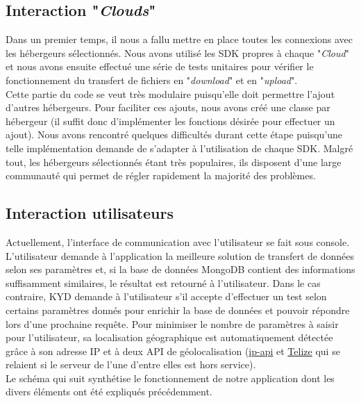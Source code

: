 \documentclass[10pt]{article}
\begin{document}
\subsection{Interaction "\textit{Clouds}"}

Dans un premier temps, il nous a fallu mettre en place toutes les connexions
avec les hébergeurs sélectionnés. Nous avons utilisé les SDK propres à chaque
"\textit{Cloud}" et nous avons ensuite effectué une série de tests unitaires
pour vérifier le fonctionnement du transfert de fichiers en "\textit{download}"
et en "\textit{upload}".\\

Cette partie du code se veut très modulaire puisqu'elle doit permettre l'ajout
d'autres hébergeurs. Pour faciliter ces ajouts, nous avons créé une classe par
hébergeur (il suffit donc d'implémenter les fonctions désirée pour effectuer un
ajout). Nous avons rencontré quelques difficultés durant cette étape puisqu'une
telle implémentation demande de s'adapter à l'utilisation de chaque SDK. Malgré
tout, les hébergeurs sélectionnés étant très populaires, ils disposent d'une
large communauté qui permet de régler rapidement la majorité des problèmes.

\subsection{Interaction utilisateurs}

Actuellement, l'interface de communication avec l'utilisateur se fait sous
console. L'utilisateur demande à l'application la meilleure solution de
transfert de données selon ses paramètres et, si la base de données MongoDB
contient des informations suffisamment similaires, le résultat est retourné à
l'utilisateur. Dans le cas contraire, KYD demande à l'utilisateur s'il accepte
d'effectuer un test selon certains paramètres donnés pour enrichir la base de
données et pouvoir répondre lors d'une prochaine requête. Pour minimiser le
nombre de paramètres à saisir pour l'utilisateur, sa localisation géographique
est automatiquement détectée grâce à son adresse IP et à deux API de
géolocalisation (\href{http://ip-api.com/docs/api:json}{ip-api} et
\href{http://www.telize.com/}{Telize} qui se relaient si le serveur de l'une
d'entre elles est hors service).\\

Le schéma qui suit synthétise le fonctionnement de notre application dont les
divers éléments ont été expliqués précédemment.
\end{document}
